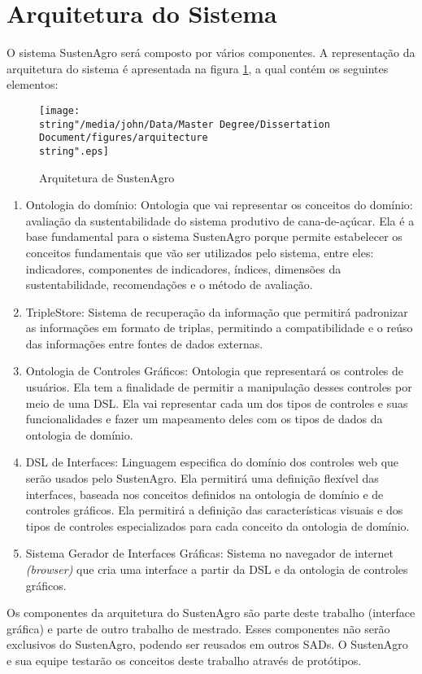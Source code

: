 \section{Arquitetura do Sistema}

O sistema SustenAgro será composto por vários componentes. A representação
da arquitetura do sistema é apresentada na figura \ref{fig:Architecture},
a qual contém os seguintes elementos:

\begin{figure}[H]
\centering{}\texttt{[image: \\string"/media/john/Data/Master Degree/Dissertation Document/figures/arquitecture\\string".eps]}\caption{Arquitetura de SustenAgro\label{fig:Architecture}}
\end{figure}

\begin{enumerate}
\item Ontologia do domínio: Ontologia que vai representar os conceitos do
domínio: avaliação da sustentabilidade do sistema produtivo de cana-de-açúcar.
Ela é a base fundamental para o sistema SustenAgro porque permite
estabelecer os conceitos fundamentais que vão ser utilizados pelo
sistema, entre eles: indicadores, componentes de indicadores, índices,
dimensões da sustentabilidade, recomendações e o método de avaliação.
\item TripleStore: Sistema de recuperação da informação que permitirá padronizar
as informações em formato de triplas, permitindo a compatibilidade
e o reúso das informações entre fontes de dados externas.
\item Ontologia de Controles Gráficos: Ontologia que representará os controles
de usuários. Ela tem a finalidade de permitir a manipulação desses
controles por meio de uma DSL. Ela vai representar cada um dos tipos
de controles e suas funcionalidades e fazer um mapeamento deles com
os tipos de dados da ontologia de domínio. 
\item DSL de Interfaces: Linguagem especifica do domínio dos controles web
que serão usados pelo SustenAgro. Ela permitirá uma definição flexível
das interfaces, baseada nos conceitos definidos na ontologia de domínio
e de controles gráficos. Ela permitirá a definição das características
visuais e dos tipos de controles especializados para cada conceito
da ontologia de domínio.
\item Sistema Gerador de Interfaces Gráficas: Sistema no navegador de internet
\emph{(browser)} que cria uma interface a partir da DSL e da ontologia
de controles gráficos.
\end{enumerate}
Os componentes da arquitetura do SustenAgro são parte deste trabalho
(interface gráfica) e parte de outro trabalho de mestrado. Esses componentes
não serão exclusivos do SustenAgro, podendo ser reusados em outros
SADs. O SustenAgro e sua equipe testarão os conceitos deste trabalho
através de protótipos.

